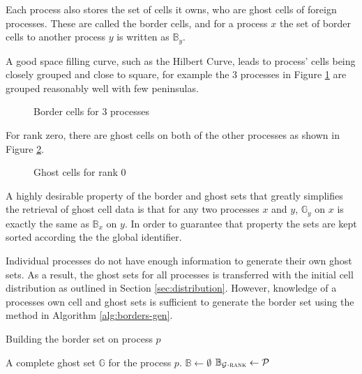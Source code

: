 \documentclass{IIBproject}
\newcommand{\vect}[1]{\bm{#1}}
\newcommand{\acc}{{\mkern 0.5mu\cdot\mkern 0.5mu}}
\begin{document}
Each process also stores the set of cells it owns, who are ghost cells of foreign processes. These are called the border cells, and for a process $x$ the set of border cells to another process $y$ is written as $\mathbb{B}_y$.

A good space filling curve, such as the Hilbert Curve, leads to process' cells being closely grouped and close to square, for example the 3 processes in Figure \ref{fig:borderline} are grouped reasonably well with few peninsulas. 

\begin{figure}[H]
	\caption{Border cells for 3 processes}
	\label{fig:borderline}
	
\end{figure}

For rank zero, there are ghost cells on both of the other processes as shown in Figure \ref{fig:borders-r0}. 

\begin{figure}[H]
	\caption{Ghost cells for rank 0}
	\label{fig:borders-r0}
	
\end{figure}

A highly desirable property of the border and ghost sets that greatly simplifies the retrieval of ghost cell data is that for any two processes $x$ and $y$, $\mathbb{G}_y$ on $x$ is exactly the same as $\mathbb{B}_x$ on $y$. In order to guarantee that property the sets are kept sorted according the the global identifier. 

Individual processes do not have enough information to generate their own ghost sets. As a result, the ghost sets for all processes is transferred with the initial cell distribution as outlined in Section \ref{sec:distribution}. However, knowledge of a processes own cell and ghost sets is sufficient to generate the border set using the method in Algorithm \ref{alg:borders-gen}.

\begin{algorithm}[H]
\caption{Building the border set on process $p$}
\label{alg:borders-gen}

\begin{algorithmic}
\Require A complete ghost set $\mathbb{G}$ for the process $p$.
\Statex
\State $\mathbb{B} \gets \emptyset$
	\ForEach {poisson neighbour $\mathcal{P} \in \mathcal{G}\acc\vect{\mathcal{P}}$}
		\If {$\mathcal{P}\acc\textproc{rank} = p$}
			\State $\mathbb{B}_{\mathcal{G}\acc\textproc{rank}} \gets \mathcal{P}$
		\EndIf
	\EndFor
\EndFor
\end{algorithmic}
\end{algorithm}
\end{document}
